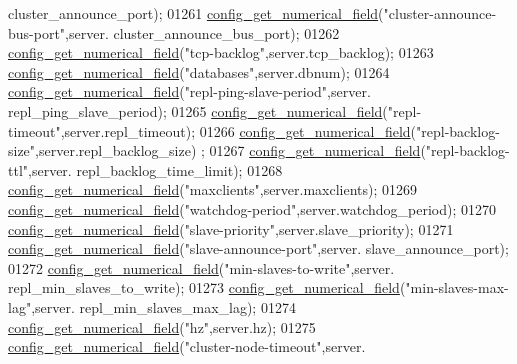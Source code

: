 \begin{DoxyCode}
{{{{{{{{{{      cluster\_announce\_port);
01261     \hyperlink{config_8c_ac10aa922264623cceca62df3262920c6}{config\_get\_numerical\_field}(\textcolor{stringliteral}{"cluster-announce-bus-port"},server.
      cluster\_announce\_bus\_port);
01262     \hyperlink{config_8c_ac10aa922264623cceca62df3262920c6}{config\_get\_numerical\_field}(\textcolor{stringliteral}{"tcp-backlog"},server.tcp\_backlog);
01263     \hyperlink{config_8c_ac10aa922264623cceca62df3262920c6}{config\_get\_numerical\_field}(\textcolor{stringliteral}{"databases"},server.dbnum);
01264     \hyperlink{config_8c_ac10aa922264623cceca62df3262920c6}{config\_get\_numerical\_field}(\textcolor{stringliteral}{"repl-ping-slave-period"},server.
      repl\_ping\_slave\_period);
01265     \hyperlink{config_8c_ac10aa922264623cceca62df3262920c6}{config\_get\_numerical\_field}(\textcolor{stringliteral}{"repl-timeout"},server.repl\_timeout);
01266     \hyperlink{config_8c_ac10aa922264623cceca62df3262920c6}{config\_get\_numerical\_field}(\textcolor{stringliteral}{"repl-backlog-size"},server.repl\_backlog\_size)
      ;
01267     \hyperlink{config_8c_ac10aa922264623cceca62df3262920c6}{config\_get\_numerical\_field}(\textcolor{stringliteral}{"repl-backlog-ttl"},server.
      repl\_backlog\_time\_limit);
01268     \hyperlink{config_8c_ac10aa922264623cceca62df3262920c6}{config\_get\_numerical\_field}(\textcolor{stringliteral}{"maxclients"},server.maxclients);
01269     \hyperlink{config_8c_ac10aa922264623cceca62df3262920c6}{config\_get\_numerical\_field}(\textcolor{stringliteral}{"watchdog-period"},server.watchdog\_period);
01270     \hyperlink{config_8c_ac10aa922264623cceca62df3262920c6}{config\_get\_numerical\_field}(\textcolor{stringliteral}{"slave-priority"},server.slave\_priority);
01271     \hyperlink{config_8c_ac10aa922264623cceca62df3262920c6}{config\_get\_numerical\_field}(\textcolor{stringliteral}{"slave-announce-port"},server.
      slave\_announce\_port);
01272     \hyperlink{config_8c_ac10aa922264623cceca62df3262920c6}{config\_get\_numerical\_field}(\textcolor{stringliteral}{"min-slaves-to-write"},server.
      repl\_min\_slaves\_to\_write);
01273     \hyperlink{config_8c_ac10aa922264623cceca62df3262920c6}{config\_get\_numerical\_field}(\textcolor{stringliteral}{"min-slaves-max-lag"},server.
      repl\_min\_slaves\_max\_lag);
01274     \hyperlink{config_8c_ac10aa922264623cceca62df3262920c6}{config\_get\_numerical\_field}(\textcolor{stringliteral}{"hz"},server.hz);
01275     \hyperlink{config_8c_ac10aa922264623cceca62df3262920c6}{config\_get\_numerical\_field}(\textcolor{stringliteral}{"cluster-node-timeout"},server.
}}}}}}}}}}
\end{DoxyCode}
